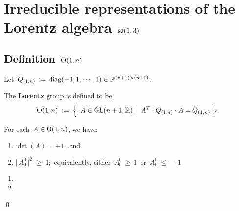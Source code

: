 

\chapter{Irreducible representations of the Lorentz algebra $\mathfrak{so}(1,3)$}
\setcounter{theorem}{0}
\setcounter{equation}{0}


\renewcommand{\theenumi}{\roman{enumi}}
\renewcommand{\labelenumi}{\textnormal{(\theenumi)}$\;\;$}


\section{Definition \,$\textnormal{O}(1,n)$}


\noindent
Let \,$Q_{(1,n)} \,:=\, \textnormal{diag}(-1,1,\cdots,1) \in \mathbb{R}^{(n+1) \times (n+1)}$.

\begin{definition}[$\textnormal{O}(1,n)$]
\mbox{}
\vskip 0.1cm
\noindent
The \textbf{Lorentz} group is defined to be:
\begin{equation*}
\textnormal{O}(1,n)
\; := \;
	\left\{\;\,
		A \overset{{\color{white}.}}{\in} \textnormal{GL}(n+1,\Re)
		\;\left\vert\;\,
			A^{T} \cdot Q_{(1,n)} \cdot A = Q_{(1,n)}
			\right.
		\;\right\}
\end{equation*}
\end{definition}

\vskip 0.5cm
\begin{proposition}
\mbox{}
\vskip 0.1cm
\noindent
For each \,$A \in \textnormal{O}(1,n)$, we have:
\begin{enumerate}
\item
	$\det(A) = \pm 1$,\, and
\item
	$\vert\,A^{0}_{0}\,\vert^{2} \;\geq\; 1$;\, equivalently, either \,$A^{0}_{0} \,\geq\, 1$\, or \,$A^{0}_{0} \,\leq\, -1$
\end{enumerate}
\end{proposition}
\proof
\begin{enumerate}
\item
\item
\end{enumerate}
\qed

